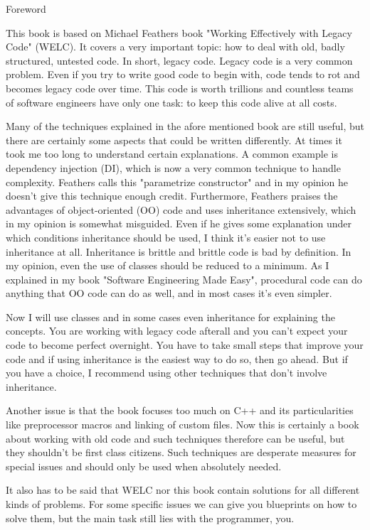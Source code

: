 
Foreword

This book is based on Michael Feathers book "Working Effectively with Legacy Code" (WELC). It covers a very important topic: how to deal with old, badly structured, untested code. In short, legacy code. Legacy code is a very common problem. Even if you try to write good code to begin with, code tends to rot and becomes legacy code over time. This code is worth trillions and countless teams of software engineers have only one task: to keep this code alive at all costs.

Many of the techniques explained in the afore mentioned book are still useful, but there are certainly some aspects that could be written differently. At times it took me too long to understand certain explanations. A common example is dependency injection (DI), which is now a very common technique to handle complexity. Feathers calls this "parametrize constructor" and in my opinion he doesn't give this technique enough credit. Furthermore, Feathers praises the advantages of object-oriented (OO) code and uses inheritance extensively, which in my opinion is somewhat misguided. Even if he gives some explanation under which conditions inheritance should be used, I think it's easier not to use inheritance at all. Inheritance is brittle and brittle code is bad by definition. In my opinion, even the use of classes should be reduced to a minimum. As I explained in my book "Software Engineering Made Easy", procedural code can do anything that OO code can do as well, and in most cases it's even simpler. 

Now I will use classes and in some cases even inheritance for explaining the concepts. You are working with legacy code afterall and you can't expect your code to become perfect overnight. You have to take small steps that improve your code and if using inheritance is the easiest way to do so, then go ahead. But if you have a choice, I recommend using other techniques that don't involve inheritance.

Another issue is that the book focuses too much on C++ and its particularities like preprocessor macros and linking of custom files. Now this is certainly a book about working with old code and such techniques therefore can be useful, but they shouldn't be first class citizens. Such techniques are desperate measures for special issues and should only be used when absolutely needed.

It also has to be said that WELC nor this book contain solutions for all different kinds of problems. For some specific issues we can give you blueprints on how to solve them, but the main task still lies with the programmer, you.  

